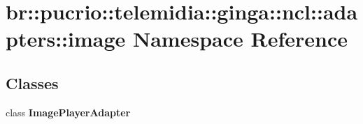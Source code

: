 \section{br::pucrio::telemidia::ginga::ncl::adapters::image Namespace Reference}
\label{namespacebr_1_1pucrio_1_1telemidia_1_1ginga_1_1ncl_1_1adapters_1_1image}


\subsection*{Classes}
\begin{CompactItemize}
\item 
class {\bf ImagePlayerAdapter}
\end{CompactItemize}
